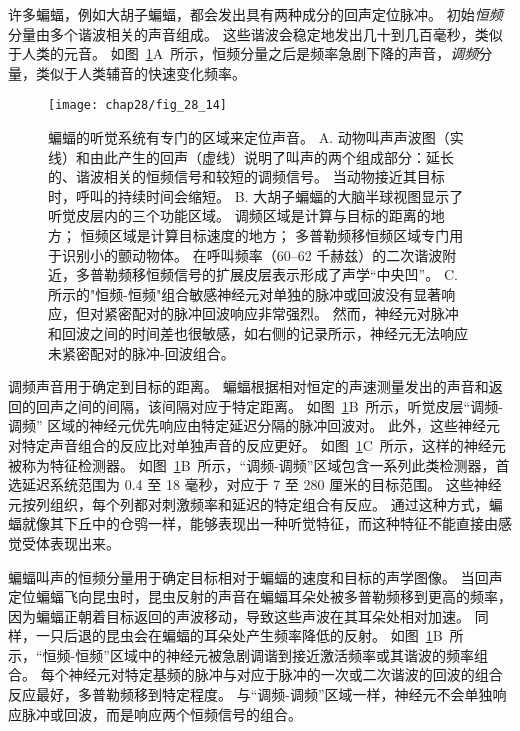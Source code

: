 许多蝙蝠，例如大胡子蝙蝠，都会发出具有两种成分的回声定位脉冲\cite{suga1983specificity,suga1984neural}。
初始\emph{恒频}分量由多个谐波相关的声音组成。 %
这些谐波会稳定地发出几十到几百毫秒，类似于人类的元音。
如图~\ref{fig:28_14}A~所示，恒频分量之后是频率急剧下降的声音，\textit{调频}分量，类似于人类辅音的快速变化频率。


\begin{figure}[htbp]
	\centering
	\texttt{[image: chap28/fig\_28\_14]}
	\caption{蝙蝠的听觉系统有专门的区域来定位声音。
		A. 动物叫声声波图（实线）和由此产生的回声（虚线）说明了叫声的两个组成部分：延长的、谐波相关的恒频信号和较短的调频信号。 
		当动物接近其目标时，呼叫的持续时间会缩短\cite{suga1984neural}。
		B. 大胡子蝙蝠的大脑半球视图显示了听觉皮层内的三个功能区域。
		调频区域是计算与目标的距离的地方；
		恒频区域是计算目标速度的地方；
		多普勒频移恒频区域专门用于识别小的颤动物体。
		在呼叫频率（60–62 千赫兹）的二次谐波附近，多普勒频移恒频信号的扩展皮层表示形成了声学“中央凹”\cite{suga1984neural}。
		C. 所示的"恒频-恒频"组合敏感神经元对单独的脉冲或回波没有显著响应，但对紧密配对的脉冲回波响应非常强烈。
		然而，神经元对脉冲和回波之间的时间差也很敏感，如右侧的记录所示，神经元无法响应未紧密配对的脉冲-回波组合\cite{suga1983specificity}。}
	\label{fig:28_14}
\end{figure}


调频声音用于确定到目标的距离。
蝙蝠根据相对恒定的声速测量发出的声音和返回的回声之间的间隔，该间隔对应于特定距离。
如图~\ref{fig:28_14}B~所示，听觉皮层“调频-调频” 区域的神经元优先响应由特定延迟分隔的脉冲回波对。
此外，这些神经元对特定声音组合的反应比对单独声音的反应更好。
如图~\ref{fig:28_14}C~所示，这样的神经元被称为特征检测器。
如图~\ref{fig:28_14}B~所示，“调频-调频”区域包含一系列此类检测器，首选延迟系统范围为 0.4 至 18 毫秒，对应于 7 至 280 厘米的目标范围。
这些神经元按列组织，每个列都对刺激频率和延迟的特定组合有反应。
通过这种方式，蝙蝠就像其下丘中的仓鸮一样，能够表现出一种听觉特征，而这种特征不能直接由感觉受体表现出来。


蝙蝠叫声的恒频分量用于确定目标相对于蝙蝠的速度和目标的声学图像。
当回声定位蝙蝠飞向昆虫时，昆虫反射的声音在蝙蝠耳朵处被多普勒频移到更高的频率，因为蝙蝠正朝着目标返回的声波移动，导致这些声波在其耳朵处相对加速。
同样，一只后退的昆虫会在蝙蝠的耳朵处产生频率降低的反射。
如图~\ref{fig:28_14}B~所示，“恒频-恒频”区域中的神经元被急剧调谐到接近激活频率或其谐波的频率组合。
每个神经元对特定基频的脉冲与对应于脉冲的一次或二次谐波的回波的组合反应最好，多普勒频移到特定程度。
与“调频-调频”区域一样，神经元不会单独响应脉冲或回波，而是响应两个恒频信号的组合。


